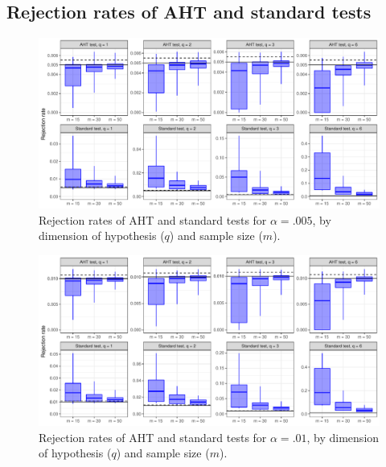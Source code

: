 \documentclass[12pt]{article}
\begin{document}
\begin{landscape}
\subsection{Rejection rates of AHT and standard tests}

\begin{figure}[p]

{\centering \includegraphics[width=\linewidth]{CR_fig/overview_005-1} 

}

\caption{Rejection rates of AHT and standard tests for $\alpha = .005$, by dimension of hypothesis ($q$) and sample size ($m$).}\label{fig:overview_005}
\end{figure}

\begin{figure}[p]

{\centering \includegraphics[width=\linewidth]{CR_fig/overview_01-1} 

}

\caption{Rejection rates of AHT and standard tests for $\alpha = .01$, by dimension of hypothesis ($q$) and sample size ($m$).}\label{fig:overview_01}
\end{figure}

\begin{figure}[p]


\end{figure}
\end{landscape}
\end{document}

